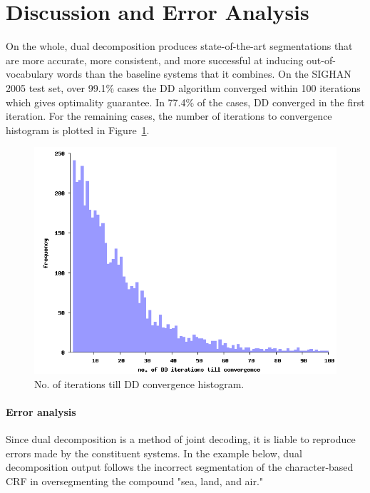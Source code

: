 \section{Discussion and Error Analysis}

On the whole, dual decomposition produces state-of-the-art segmentations that are more accurate, more consistent, and more successful at inducing out-of-vocabulary words than the baseline systems that it combines.
On the SIGHAN 2005 test set, over 99.1\% cases the DD algorithm converged within 100 iterations which gives optimality guarantee. 
In 77.4\% of the cases, DD converged in the first iteration. For the remaining cases, the number of iterations to convergence histogram is plotted in Figure~\ref{fig:histo}.

\begin{figure}
\begin{center}
\includegraphics[width=\columnwidth]{histogram.png}
\caption{No. of iterations till DD convergence histogram.}
\label{fig:histo}
\end{center}
\end{figure}

\paragraph{Error analysis}

Since dual decomposition is a method of joint decoding, it is liable to reproduce errors made by the constituent systems. In the example below, dual decomposition output follows the incorrect segmentation of the character-based CRF in oversegmenting the compound "sea, land, and air." 

